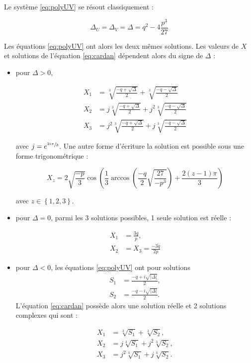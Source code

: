 Le système \ref{eq:polyUV} se résout classiquement : 

\begin{equation}
\Delta_U = \Delta_V = \Delta = q^2-4\frac{p^3}{27}
\end{equation}

Les équations \ref{eq:polyUV} ont alors les deux mêmes solutions. Les valeurs de $X$ et solutions de l'équation \ref{eq:cardan} dépendent alors du signe de $\Delta$ : 

\begin{itemize}
\item pour $\Delta >0$, 

\begin{subequations}
\begin{align}
X_1 &= \sqrt[3]{\frac{-q+\sqrt{\Delta}}{2}}+\sqrt[3]{\frac{-q-\sqrt{\Delta}}{2}}\\
X_2 &= j\sqrt[3]{\frac{-q+\sqrt{\Delta}}{2}}+j^2\sqrt[3]{\frac{-q-\sqrt{\Delta}}{2}}\\
X_3 &= j^2\sqrt[3]{\frac{-q+\sqrt{\Delta}}{2}}+j\sqrt[3]{\frac{-q-\sqrt{\Delta}}{2}}
\end{align}
\end{subequations}

avec $j = e^{\sfrac{2i\pi}{3}}$. Une autre forme d'écriture la solution est possible sous une forme trigonométrique : 

\begin{equation}
X_{z} = 2\sqrt{\frac{-p}{3}} \cos \left(\frac{1}{3} \arccos\left(\frac{-q}{2}\sqrt{\frac{27}{-p^3}}\right) + \frac{2(z-1)\pi}{3}\right)
\end{equation}

avec $z \in \left\lbrace 1,2,3 \right\rbrace$.


\item pour $\Delta = 0$, parmi les 3 solutions possibles, 1 seule solution est réelle : 

\begin{subequations}
\begin{align}
X_1 &= \frac{3q}{p},\\
X_2 &= X_3 = \frac{-3q}{2p}
\end{align}
\end{subequations}

\item pour $\Delta < 0$, les équations \ref{eq:polyUV} ont pour solutions 
\begin{align}
S_1 &= \frac{-q+i\sqrt{\vert\Delta \vert}}{2},\\
S_2 &= \frac{-q-i\sqrt{\vert \Delta \vert}}{2}. 
\end{align} 
L'équation \ref{eq:cardan} possède alors une solution réelle et 2 solutions complexes qui sont 
: 

\begin{subequations}
\begin{align}
X_1 &= \sqrt[3]{S_1}+\sqrt[3]{S_2},\\
X_2 &= j\sqrt[3]{S_1}+j^2\sqrt[3]{S_2},\\
X_3 &= j^2\sqrt[3]{S_1}+j\sqrt[3]{S_2}.
\end{align}
\end{subequations}
\end{itemize}

